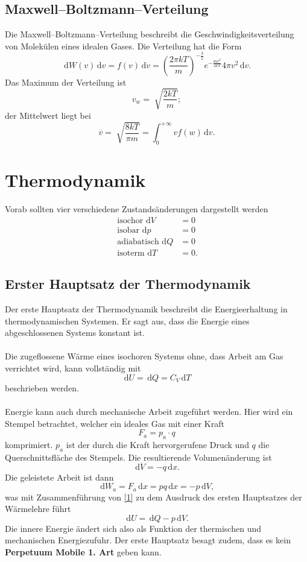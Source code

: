 \documentclass[a4paper,12pt]{article}
\newcommand{\td}{\,\text{d}}
\begin{document}
\subsection{Maxwell--Boltzmann--Verteilung}
Die Maxwell--Boltzmann--Verteilung beschreibt die Geschwindigkeitsverteilung von Molekülen eines idealen Gases. Die Verteilung hat die Form
\[ 
        \td W(v)\td v=f(v)\td v=\left(\dfrac{2\pi kT}{m}\right)^{-\tfrac{3}{2}}e^{-\tfrac{mv^2}{2kT}}4\pi v^2\td v
.\] 
Das Maximum der Verteilung ist 
\[ 
        v_w=\sqrt[]{\dfrac{2kT}{m}}
;\]  
der Mittelwert liegt bei
\[ 
        \overline{v}=\sqrt[]{\dfrac{8kT}{\pi m}}=\int_{0}^{+\infty}vf(w)\td v
.\] 

\newpage
\section{Thermodynamik}
Vorab sollten vier verschiedene Zustandsänderungen dargestellt werden
\begin{align*}
        \,\text{isochor}\,\td V&=0\\
        \,\text{isobar}\,\td p&=0\\
        \,\text{adiabatisch}\,\td Q&=0\\
        \,\text{isoterm}\,\td T&=0
.\end{align*}

\subsection{Erster Hauptsatz der Thermodynamik}
Der erste Hauptsatz der Thermodynamik beschreibt die Energieerhaltung in thermodynamischen Systemen. Er sagt aus, dass die Energie eines abgeschlossenen Systems konstant ist.\\\\
Die zugeflossene Wärme eines isochoren Systems ohne, dass Arbeit am Gas verrichtet wird, kann vollständig mit
\[ 
        \td U=\td Q=C_V\td T\tag{1}\label{1} %
\] 
beschrieben werden.\\\\
Energie kann auch durch mechanische Arbeit zugeführt werden. Hier wird ein Stempel betrachtet, welcher ein ideales Gas mit einer Kraft
\[ 
        F_a=p_a\cdot q
\] 
komprimiert. $p_a$ ist der durch die Kraft hervorgerufene Druck und $q$ die Querschnittsfläche des Stempels. Die resultierende Volumenänderung ist
\[ 
        \td V=-q\td x
.\] 
Die geleistete Arbeit ist dann
\[ 
        \td W_a=F_a\td x=pq\td x=-p\td V
,\] 
was mit Zusammenführung von \eqref{1} zu dem Ausdruck des ersten Hauptsatzes der Wärmelehre führt
\[ 
        \td U=\td Q-p\td V
.\] 
Die innere Energie ändert sich also als Funktion der thermischen und mechanischen Energiezufuhr. Der erste Hauptsatz besagt zudem, dass es kein \textbf{Perpetuum Mobile 1. Art} geben kann.
\end{document}
